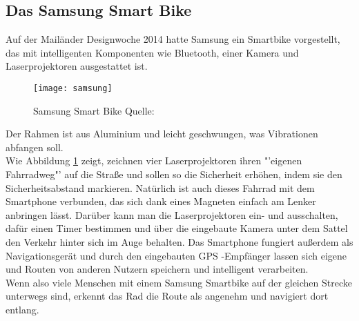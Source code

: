 \subsection{Das Samsung Smart Bike}
Auf der Mailänder Designwoche 2014 hatte Samsung ein Smartbike vorgestellt, das mit intelligenten Komponenten wie Bluetooth, einer Kamera und Laserprojektoren ausgestattet ist.\\ 
\begin{figure}[H]
    \centering
    \texttt{[image: samsung]}
    \grayRule
    \caption[Samsung Smart Bike]{Samsung Smart Bike  Quelle: \cite{smartbike}} 
    \label{fig:samsung}
\end{figure}
Der Rahmen ist aus Aluminium und leicht geschwungen, was Vibrationen abfangen soll.\\
Wie Abbildung \ref{fig:samsung} zeigt, zeichnen vier Laserprojektoren ihren "'eigenen Fahrradweg"' auf die Straße und sollen so die Sicherheit erhöhen, indem sie den Sicherheitsabstand markieren. Natürlich ist auch dieses Fahrrad mit dem \gls{Smartphone} verbunden, das sich dank eines Magneten einfach am Lenker anbringen lässt. Darüber kann man die Laserprojektoren ein- und ausschalten, dafür einen Timer bestimmen und über die eingebaute Kamera unter dem Sattel den Verkehr hinter sich im Auge behalten. Das \gls{Smartphone} fungiert außerdem als Navigationsgerät und durch den eingebauten \gls{GPS} -Empfänger lassen sich eigene und Routen von anderen Nutzern speichern und intelligent verarbeiten. \cite{smartbike}\\ 
Wenn also viele Menschen mit einem Samsung Smartbike auf der gleichen Strecke unterwegs sind, erkennt das Rad die Route als angenehm und navigiert dort entlang.
